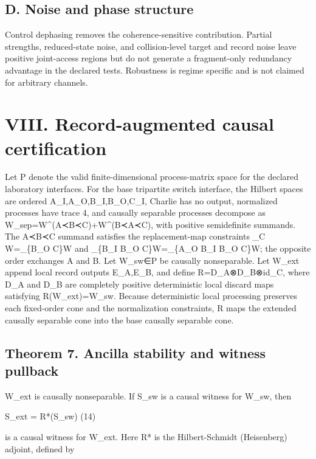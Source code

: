 \documentclass[
]{article}
\begin{document}
\subsection{D. Noise and phase
structure}\label{d.-noise-and-phase-structure}

Control dephasing removes the coherence-sensitive contribution. Partial
strengths, reduced-state noise, and collision-level target and record
noise leave positive joint-access regions but do not generate a
fragment-only redundancy advantage in the declared tests. Robustness is
regime specific and is not claimed for arbitrary channels.

\section{VIII. Record-augmented causal
certification}\label{viii.-record-augmented-causal-certification}

Let P denote the valid finite-dimensional process-matrix space for the
declared laboratory interfaces. For the base tripartite switch
interface, the Hilbert spaces are ordered A\_I,A\_O,B\_I,B\_O,C\_I,
Charlie has no output, normalized processes have trace 4, and causally
separable processes decompose as W\_sep=W\^{}(A≺B≺C)+W\^{}(B≺A≺C), with
positive semidefinite summands. The A≺B≺C summand satisfies the
replacement-map constraints \_C W=\_\{B\_O C\}W and \_\{B\_I B\_O
C\}W=\_\{A\_O B\_I B\_O C\}W; the opposite order exchanges A and B. Let
W\_sw∈P be causally nonseparable. Let W\_ext append local record outputs
E\_A,E\_B, and define R=D\_A⊗D\_B⊗id\_C, where D\_A and D\_B are
completely positive deterministic local discard maps satisfying
R(W\_ext)=W\_sw. Because deterministic local processing preserves each
fixed-order cone and the normalization constraints, R maps the extended
causally separable cone into the base causally separable cone.

\subsection{Theorem 7. Ancilla stability and witness
pullback}\label{theorem-7.-ancilla-stability-and-witness-pullback}

W\_ext is causally nonseparable. If S\_sw is a causal witness for W\_sw,
then

S\_ext = R*(S\_sw) (14)

is a causal witness for W\_ext. Here R* is the Hilbert-Schmidt
(Heisenberg) adjoint, defined by
\end{document}
